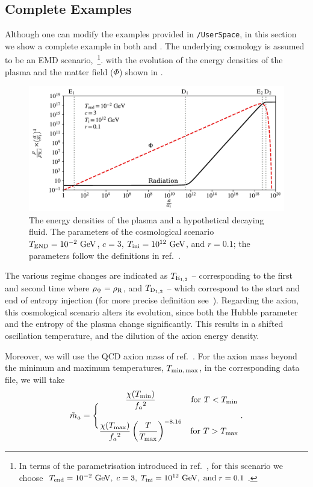\documentclass[11pt,a4paper]{article}
\begin{document}
\subsection{Complete Examples}\label{sec:complete_examples}
%
Although one can modify the examples provided in {\tt \mimes/UserSpace}, in this section we show a complete example in both \CPP and \PY. 
%
The underlying cosmology is assumed to be an EMD scenario,~\footnote{In terms of the parametrisation introduced in ref.~\cite{Arias:2019uol,Arias:2020qty},  for this scenario we choose $T_{\rm end}=10^{-2} ~{\rm GeV},\; c=3, \; T_{\rm ini}=10^{12} ~{\rm GeV}, \; \text{and}\; r=0.1$.}.
%
with the evolution of the energy densities of the plasma and the matter field ($\Phi$) shown in .
%
\begin{figure}[t]
	\includegraphics[width=1\textwidth]{figs/energy_densities.pdf}
	\caption{The energy densities of the plasma and a hypothetical decaying fluid. The parameters of the cosmological scenario  $T_{\rm END}=10^{-2}~{\rm GeV}$, $c=3$, $T_{\rm ini}=10^{12}~{\rm GeV}$, and $r=0.1$; the parameters  follow the definitions in ref.~\cite{Arias:2020qty}. }
	\label{fig:energy_densities}
\end{figure}
%
The various regime changes are indicated as $T_{{\rm E}_{1,2}}$ -- corresponding to the first and second time where $\rho_{\Phi} = \rho_{\rm R}$,  and $T_{{\rm D}_{1,2}}$ -- which correspond to the start and end of entropy injection (for more precise definition see~\cite{Arias:2020qty}). Regarding the axion, this cosmological scenario alters its evolution, since both the Hubble parameter and the entropy of the plasma change significantly. This results in a shifted oscillation temperature, and the dilution of the axion energy density.

Moreover, we will use the QCD axion mass of ref.~\cite{Borsanyi:2016ksw}. For the axion mass beyond the minimum and maximum temperatures, $T_{\rm min, \, max}$, in the corresponding data file, we will take
%
\begin{equation}
	\tilde m_{a}{} = \Bigg\{
	\begin{matrix}
		\dfrac{\chi(T_{\rm min})}{f_{a}{}^2} & \text{for } T<T_{\rm min} 
		\\ \\
		\dfrac{\chi(T_{\rm max})}{f_{a}{}^2}   \left( \dfrac{T}{T_{\rm max}} \right)^{-8.16} & \text{for } T>T_{\rm max} 
	\end{matrix} \;.
	\label{eq:axM-limits}
\end{equation}
\end{document}
